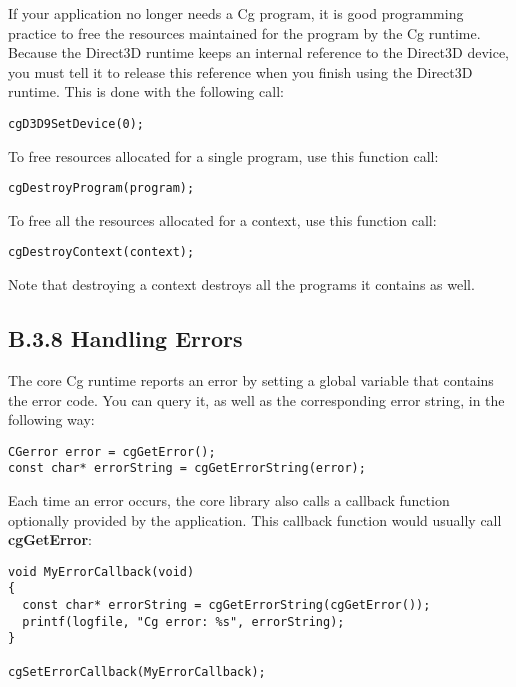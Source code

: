 \documentclass[../main.tex]{subfiles}
\begin{document}
If your application no longer needs a Cg program, it is good programming practice to free the resources maintained for the program by the Cg runtime. Because the Direct3D runtime keeps an internal reference to the Direct3D device, you must tell it to release this reference when you finish using the Direct3D runtime. This is done with the following call:

\FloatBarrier
\begin{lstlisting}
cgD3D9SetDevice(0);
\end{lstlisting}
\FloatBarrier

To free resources allocated for a single program, use this function call:

\FloatBarrier
\begin{lstlisting}
cgDestroyProgram(program);
\end{lstlisting}
\FloatBarrier

To free all the resources allocated for a context, use this function call:

\FloatBarrier
\begin{lstlisting}
cgDestroyContext(context);
\end{lstlisting}
\FloatBarrier

Note that destroying a context destroys all the programs it contains as well.

\subsection{B.3.8 Handling Errors}

The core Cg runtime reports an error by setting a global variable that contains the error code. You can query it, as well as the corresponding error string, in the following way:

\FloatBarrier
\begin{lstlisting}
CGerror error = cgGetError();
const char* errorString = cgGetErrorString(error);
\end{lstlisting}
\FloatBarrier

Each time an error occurs, the core library also calls a callback function optionally provided by the application. This callback function would usually call \textbf{cgGetError}:

\FloatBarrier
\begin{lstlisting}
void MyErrorCallback(void)
{
  const char* errorString = cgGetErrorString(cgGetError());
  printf(logfile, "Cg error: %s", errorString);
}

cgSetErrorCallback(MyErrorCallback);
\end{lstlisting}
\FloatBarrier
\end{document}
